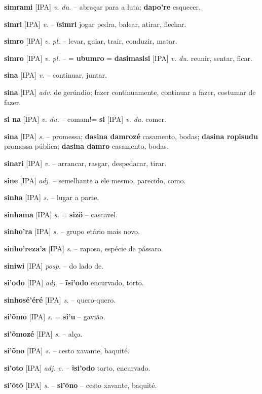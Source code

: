 \textbf{simrami} [IPA] \textit{v. du.} -- abraçar para a luta; \textbf{dapo're} esquecer.

\textbf{simri} [IPA] \textit{v.} -- \textbf{ĩsimri} jogar pedra, balear, atirar, flechar.

\textbf{simro} [IPA] \textit{v. pl.} -- levar, guiar, trair, conduzir, matar.

\textbf{simro} [IPA] \textit{v. pl.} -- = \textbf{ubumro} = \textbf{dasimasisi} [IPA] \textit{v. du.} reunir, sentar, ficar.

\textbf{sina} [IPA] \textit{v.} -- continuar, juntar.

\textbf{sina} [IPA] \textit{adv.} de gerúndio; fazer continuamente, continuar a fazer, costumar de fazer.

\textbf{si na} [IPA] \textit{v. du.} -- comam!= \textbf{si} [IPA] \textit{v. du.} comer.

\textbf{sina} [IPA] \textit{s.} -- promessa; \textbf{dasina damrozé} casamento, bodas; \textbf{dasina ropisudu} promessa pública; \textbf{dasina damro} casamento, bodas.

\textbf{sinari} [IPA] \textit{v.} -- arrancar, rasgar, despedacar, tirar.

\textbf{sine} [IPA] \textit{adj.} -- semelhante a ele mesmo, parecido, como.

\textbf{sinha} [IPA] \textit{s.} -- lugar a parte.

\textbf{sinhama} [IPA] \textit{s.} = \textbf{sizö} -- cascavel.

\textbf{sinho'ra} [IPA] \textit{s.} -- grupo etário mais novo.

\textbf{sinho'reza'a} [IPA] \textit{s.} -- raposa, espécie de pássaro.

\textbf{siniwi} [IPA] \textit{posp.} -- do lado de.

\textbf{si'odo} [IPA] \textit{adj.} -- \textbf{ĩsi'odo} encurvado, torto.

\textbf{sinhosé'éré} [IPA] \textit{s.} -- quero-quero.

\textbf{si'õmo} [IPA] \textit{s.} = \textbf{si'u} -- gavião.

\textbf{si'õmozé} [IPA] \textit{s.} -- alça.

\textbf{si'õno} [IPA] \textit{s.} -- cesto xavante, baquité.

\textbf{si'oto} [IPA] \textit{adj. c.} -- \textbf{ĩsi'odo} torto, encurvado.

\textbf{si'õtõ} [IPA] \textit{s.} -- \textbf{si'õno} -- cesto xavante, baquité.

